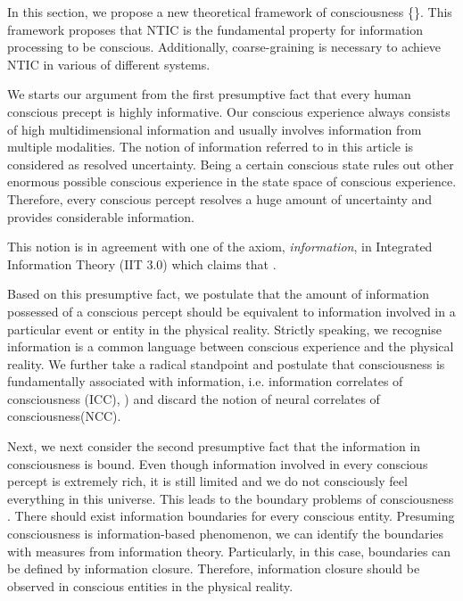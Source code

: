 

        In this section, we propose a new theoretical framework of consciousness \{\tnamefull\}. This framework proposes that NTIC is the fundamental property for information processing to be conscious. Additionally, coarse-graining is necessary to achieve NTIC in various of different systems. 

        We starts our argument from the first presumptive fact that every human conscious precept is highly informative. Our conscious experience always consists of high multidimensional information and usually involves information from multiple modalities. The notion of information referred to in this article is considered as resolved uncertainty. Being a certain conscious state rules out other enormous possible conscious experience in the state space of conscious experience. Therefore, every conscious percept resolves a huge amount of uncertainty and provides considerable information. 
        
        This notion is in agreement with one of the axiom, \textit{information}, in Integrated Information Theory (IIT 3.0) which claims that  \citep[p. 2]{oizumi2014phenomenology}.
        
        Based on this presumptive fact, we postulate that the amount of information possessed of a conscious percept should be equivalent to information involved in a particular event or entity in the physical reality. Strictly speaking, we recognise information is a common language between conscious experience and the physical reality. We further take a radical standpoint and postulate that consciousness is fundamentally associated with information, i.e. information correlates of consciousness (ICC), \cite{chalmers1996conscious, tononi2004information, gamez2011information, Gamez2016}) and discard the notion of neural correlates of consciousness(NCC). 
        
        Next, we next consider the second presumptive fact that the information in consciousness is bound. Even though information involved in every conscious percept is extremely rich, it is still limited and we do not consciously feel everything in this universe. This leads to the boundary problems of consciousness \cite{goff2006experiences}. There should exist information boundaries for every conscious entity. Presuming consciousness is information-based phenomenon, we can identify the boundaries with measures from information theory. Particularly, in this case, boundaries can be defined by information closure. Therefore, information closure should be observed in conscious entities in the physical reality. 
        
